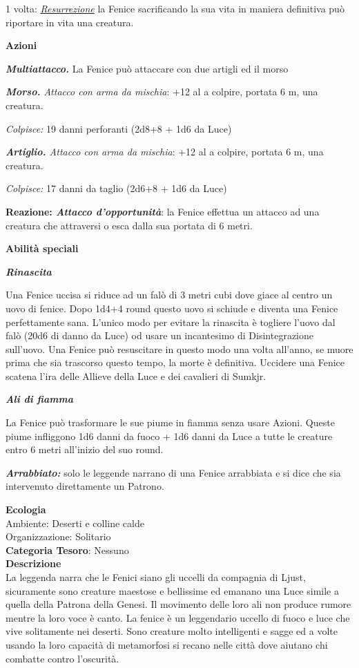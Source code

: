 \begin{multicols}{2}
{1 volta: \emph{\hyperlink{Resurrezione}{Resurrezione}} la Fenice sacrificando la sua vita in maniera definitiva può riportare in vita una creatura.

\textbf{Azioni}

\emph{\textbf{Multiattacco.}} La Fenice può attaccare con due artigli ed il morso

\emph{\textbf{Morso.} Attacco con arma da mischia}: +12 al a colpire, portata 6 m, una creatura.

\emph{Colpisce:} 19 danni perforanti (2d8+8 + 1d6 da Luce)

\emph{\textbf{Artiglio.} Attacco con arma da mischia}: +12 al a colpire, portata 6 m, una creatura.

\emph{Colpisce:} 17 danni da taglio (2d6+8 + 1d6 da Luce)

\textbf{Reazione: \emph{Attacco d'opportunità}}: la Fenice effettua un attacco ad una creatura che attraversi o esca dalla sua portata di 6 metri.

\textbf{Abilità speciali}

\emph{\textbf{Rinascita}}

Una Fenice uccisa si riduce ad un falò di 3 metri cubi dove giace al centro un uovo di fenice. Dopo 1d4+4 round questo uovo si schiude e diventa una Fenice perfettamente sana. L'unico modo per evitare la rinascita è togliere l'uovo dal falò (20d6 di danno da Luce) od usare un incantesimo di Disintegrazione sull'uovo.
Una Fenice può resuscitare in questo modo una volta all'anno, se muore prima che sia trascorso questo tempo, la morte è definitiva. Uccidere una Fenice scatena l'ira delle Allieve della Luce e dei cavalieri di Sumkjr.

\emph{\textbf{Ali di fiamma}}

La Fenice può trasformare le sue piume in fiamma senza usare Azioni. Queste piume infliggono 1d6 danni da fuoco + 1d6 danni da Luce a tutte le creature entro 6 metri all'inizio del suo round.

\emph{\textbf{Arrabbiato:}} solo le leggende narrano di una Fenice arrabbiata e si dice che sia intervenuto direttamente un Patrono.

\textbf{Ecologia}\\
Ambiente: Deserti e colline calde\\
Organizzazione: Solitario\\
\textbf{Categoria Tesoro}: Nessuno\\
\textbf{Descrizione}\\
La leggenda narra che le Fenici siano gli uccelli da compagnia di Ljust, sicuramente sono creature maestose e bellissime ed emanano una Luce simile a quella della Patrona della Genesi. Il movimento delle loro ali non produce rumore mentre la loro voce è canto. La fenice è un leggendario uccello di fuoco e luce che vive solitamente nei deserti. Sono creature molto intelligenti e sagge ed a volte usando la loro capacità di metamorfosi si recano nelle città dove aiutano chi combatte contro l'oscurità.

}
\end{multicols}
